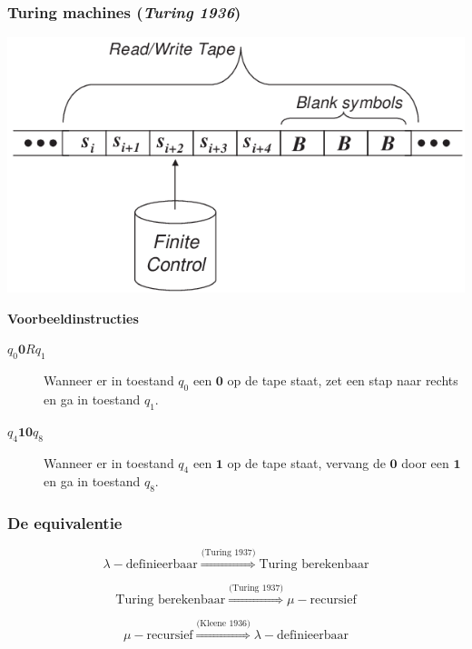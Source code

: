 \documentclass{beamer}
\begin{document}
\begin{frame}{}
    \frametitle{Turing machines (\emph{Turing 1936})}
    \begin{center}
        \includegraphics[height=0.3\textheight]{tm.png}
    \end{center}    
    \textbf{Voorbeeldinstructies}
    \begin{description}
        \item[$q_0\mathbf{0}Rq_1$] Wanneer er in toestand $q_0$ een $\mathbf{0}$ op 
        de tape staat, zet een stap naar rechts en ga in toestand $q_1$.
        \item[$q_4\mathbf{1}\mathbf{0}q_8$] Wanneer er in toestand $q_4$ een $\mathbf{1}$
        op de tape staat, vervang de $\mathbf{0}$ door een $\mathbf{1}$ en ga in toestand $q_8$.
    \end{description}
\end{frame}

\begin{frame}
    \frametitle{De equivalentie}

    $$\lambda-\text{definieerbaar} \stackrel{\scriptscriptstyle \text{(Turing 1937)}}{\Longrightarrow} \text{Turing berekenbaar}$$

    $$\text{Turing berekenbaar} \stackrel{\scriptscriptstyle \text{(Turing 1937)}}{\Longrightarrow} \mu-\text{recursief} $$

    $$\mu-\text{recursief} \stackrel{\scriptscriptstyle \text{(Kleene 1936)}}{\Longrightarrow} \lambda-\text{definieerbaar} $$
\end{frame}
\end{document}
